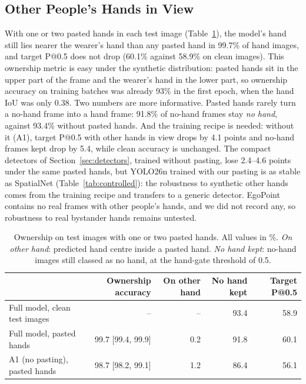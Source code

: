 \subsection{Other People's Hands in View}\label{sec:own}

With one or two pasted hands in each test image (Table~\ref{tab:own}), the model's hand still lies nearer the wearer's hand than any pasted hand in 99.7\% of hand images, and target P@0.5 does not drop (60.1\% against 58.9\% on clean images). This ownership metric is easy under the synthetic distribution: pasted hands sit in the upper part of the frame and the wearer's hand in the lower part, so ownership accuracy on training batches was already 93\% in the first epoch, when the hand IoU was only 0.38. Two numbers are more informative. Pasted hands rarely turn a no-hand frame into a hand frame: 91.8\% of no-hand frames stay \emph{no hand}, against 93.4\% without pasted hands. And the training recipe is needed: without it (A1), target P@0.5 with other hands in view drops by 4.1 points and no-hand frames kept drop by 5.4, while clean accuracy is unchanged. The compact detectors of Section~\ref{sec:detectors}, trained without pasting, lose 2.4--4.6 points under the same pasted hands, but YOLO26n trained with our pasting is as stable as SpatialNet (Table~\ref{tab:controlled}): the robustness to synthetic other hands comes from the training recipe and transfers to a generic detector. EgoPoint contains no real frames with other people's hands, and we did not record any, so robustness to real bystander hands remains untested.

\begin{table}[t]
  \caption{Ownership on test images with one or two pasted hands. All values in \%. \emph{On other hand}: predicted hand centre inside a pasted hand. \emph{No hand kept}: no-hand images still classed as no hand, at the hand-gate threshold of 0.5.}
  \label{tab:own}
  \footnotesize
  \begin{tabular}{lrrrr}
    \toprule
    & Ownership accuracy & On other hand & No hand kept & Target P@0.5 \\
    \midrule
    Full model, clean test images & -- & -- & 93.4 & 58.9 \\
    Full model, pasted hands & 99.7 [99.4, 99.9] & 0.2 & 91.8 & 60.1 \\
    A1 (no pasting), pasted hands & 98.7 [98.2, 99.1] & 1.2 & 86.4 & 56.1 \\
    \bottomrule
  \end{tabular}
\end{table}

